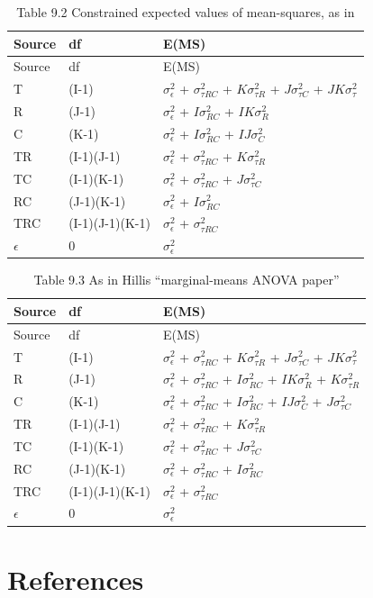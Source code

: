 \documentclass[
]{book}
\begin{document}
\begin{longtable}[]{@{}lll@{}}
\caption{Table 9.2 Constrained expected values of mean-squares, as in \citep{RN204}}\tabularnewline
\toprule
Source & df & E(MS)\tabularnewline
\midrule
\endfirsthead
\toprule
Source & df & E(MS)\tabularnewline
\midrule
\endhead
T & (I-1) & \(\sigma_{\epsilon}^{2}\) + \(\sigma_{\tau RC}^{2}\) + \(K\sigma_{\tau R}^{2}\) + \(J\sigma_{\tau C}^{2}\) + \(JK\sigma_{\tau}^{2}\)\tabularnewline
R & (J-1) & \(\sigma_{\epsilon}^{2}\) + \(I\sigma_{RC}^{2}\) + \(IK\sigma_{R}^{2}\)\tabularnewline
C & (K-1) & \(\sigma_{\epsilon}^{2}\) + \(I\sigma_{RC}^{2}\) + \(IJ\sigma_{C}^{2}\)\tabularnewline
TR & (I-1)(J-1) & \(\sigma_{\epsilon}^{2}\) + \(\sigma_{\tau RC}^{2}\) + \(K\sigma_{\tau R}^{2}\)\tabularnewline
TC & (I-1)(K-1) & \(\sigma_{\epsilon}^{2}\) + \(\sigma_{\tau RC}^{2}\) + \(J\sigma_{\tau C}^{2}\)\tabularnewline
RC & (J-1)(K-1) & \(\sigma_{\epsilon}^{2}\) + \(I\sigma_{RC}^{2}\)\tabularnewline
TRC & (I-1)(J-1)(K-1) & \(\sigma_{\epsilon}^{2}\) + \(\sigma_{\tau RC}^{2}\)\tabularnewline
\(\epsilon\) & 0 & \(\sigma_{\epsilon}^{2}\)\tabularnewline
\bottomrule
\end{longtable}

\begin{longtable}[]{@{}lll@{}}
\caption{Table 9.3 As in Hillis ``marginal-means ANOVA paper'' \citep{RN2508}}\tabularnewline
\toprule
Source & df & E(MS)\tabularnewline
\midrule
\endfirsthead
\toprule
Source & df & E(MS)\tabularnewline
\midrule
\endhead
T & (I-1) & \(\sigma_{\epsilon}^{2}\) + \(\sigma_{\tau RC}^{2}\) + \(K\sigma_{\tau R}^{2}\) + \(J\sigma_{\tau C}^{2}\) + \(JK\sigma_{\tau}^{2}\)\tabularnewline
R & (J-1) & \(\sigma_{\epsilon}^{2}\) + \(\sigma_{\tau RC}^{2}\) + \(I\sigma_{RC}^{2}\) + \(IK\sigma_{R}^{2}\) + \(K\sigma_{\tau R}^{2}\)\tabularnewline
C & (K-1) & \(\sigma_{\epsilon}^{2}\) + \(\sigma_{\tau RC}^{2}\) + \(I\sigma_{RC}^{2}\) + \(IJ\sigma_{C}^{2}\) + \(J\sigma_{\tau C}^{2}\)\tabularnewline
TR & (I-1)(J-1) & \(\sigma_{\epsilon}^{2}\) + \(\sigma_{\tau RC}^{2}\) + \(K\sigma_{\tau R}^{2}\)\tabularnewline
TC & (I-1)(K-1) & \(\sigma_{\epsilon}^{2}\) + \(\sigma_{\tau RC}^{2}\) + \(J\sigma_{\tau C}^{2}\)\tabularnewline
RC & (J-1)(K-1) & \(\sigma_{\epsilon}^{2}\) + \(\sigma_{\tau RC}^{2}\) + \(I\sigma_{RC}^{2}\)\tabularnewline
TRC & (I-1)(J-1)(K-1) & \(\sigma_{\epsilon}^{2}\) + \(\sigma_{\tau RC}^{2}\)\tabularnewline
\(\epsilon\) & 0 & \(\sigma_{\epsilon}^{2}\)\tabularnewline
\bottomrule
\end{longtable}

\hypertarget{dbm-analysis-significance-testing-references}{%
\section{References}\label{dbm-analysis-significance-testing-references}}
\end{document}
